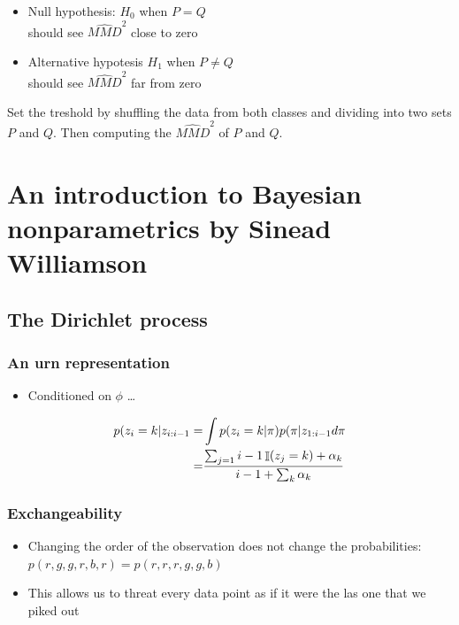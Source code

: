 \documentclass[b5paper]{report}
\begin{document}
\begin{itemize}
  \item Null hypothesis: $H_0$ when $P = Q$ \\
    should see $\hat{MMD}^2$ close to zero
  \item Alternative hypotesis $H_1$ when $P \ne Q$ \\
    should see $\hat{MMD}^2$ far from zero
\end{itemize}

Set the treshold by shuffling the data from both classes and dividing into two
sets $P$ and $Q$. Then computing the $\hat{MMD}^2$ of $P$ and $Q$.

\chapter{An introduction to Bayesian nonparametrics by Sinead Williamson}

\section{The Dirichlet process}

\subsection{An urn representation}

\begin{itemize}
  \item Conditioned on $\phi$ \dots
\end{itemize}

\begin{align}
  p(z_i = k| z_{i:i-1} =& \int p(z_i = k| \pi) p(\pi|z_{1:i-1} d\pi \\
      =& \frac{\sum_{j=1}{i-1} \operatorname*{\mathbb{\mathop{I}}}(z_j = k) + \alpha_k}{i - 1 + \sum_k
      \alpha_k}
\end{align}

\subsection{Exchangeability}

\begin{itemize}
  \item Changing the order of the observation does not change the probabilities:
    $p(r,g,g,r,b,r) = p(r,r,r,g,g,b)$
  \item This allows us to threat every data point as if it were the las one
    that we piked out
\end{itemize}
\end{document}

